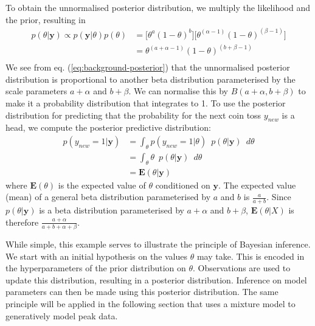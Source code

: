 To obtain the unnormalised posterior distribution, we multiply the likelihood and the prior, resulting in
\begin{equation}
\begin{aligned}
p(\theta \vert \mathbf{y}) \propto p(\mathbf{y} \vert \theta)p(\theta) &= \bigg[\theta^a (1-\theta)^b\bigg] \bigg[\theta^{(\alpha-1)} (1-\theta)^{(\beta-1)}\bigg] \\
                                                                               &= \theta^{(a+\alpha-1)} (1-\theta)^{(b+\beta-1)} \\
\label{eq:background-posterior}
\end{aligned}
\end{equation}
We see from eq. (\ref{eq:background-posterior}) that the unnormalised posterior distribution is proportional to another beta distribution parameterised by the scale parameters $a+\alpha$ and $b+\beta$. We can normalise this by $B(a+\alpha,b+\beta)$ to make it a probability distribution that integrates to 1. To use the posterior distribution for predicting that the probability for the next coin toss $y_{new}$ is a head, we compute the posterior predictive distribution:
\begin{equation}
\begin{aligned}
p(y_{new}=1 \vert \mathbf{y}) &= \int_{\theta} p(y_{new}=1 \vert \theta) \enspace p(\theta \vert \mathbf{y}) \enspace d\theta \\
                                 &= \int_{\theta} \theta \enspace p(\theta \vert \mathbf{y}) \enspace d\theta \\
                                 &= \mathbf{E}(\theta \vert \mathbf{y})
\end{aligned}
\label{eq:example-posterior-predictive}
\end{equation}
where $\mathbf{E}(\theta)$ is the expected value of $\theta$ conditioned on $\mathbf{y}$. The expected value (mean) of a general beta distribution parameterised by $a$ and $b$ is $\frac{a}{a+b}$. Since $p(\theta \vert \mathbf{y})$ is a beta distribution parameterised by $a+\alpha$ and $b+\beta$, $\mathbf{E}(\theta \vert X)$ is therefore $\frac{a+\alpha}{a+b+\alpha+\beta}$. 

While simple, this example serves to illustrate the principle of Bayesian inference. We start with an initial hypothesis on the values $\theta$ may take. This is encoded in the hyperparameters of the prior distribution on $\theta$. Observations are used to update this distribution, resulting in a posterior distribution. Inference on model parameters can then be made using this posterior distribution. The same principle will be applied in the following section that uses a mixture model to generatively model peak data.

